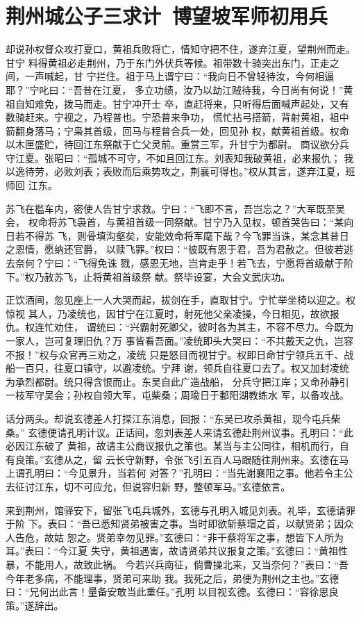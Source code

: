 \chapter{荆州城公子三求计~博望坡军师初用兵}

却说孙权督众攻打夏口，黄祖兵败将亡，情知守把不住，遂弃江夏，望荆州而走。甘宁
料得黄祖必走荆州，乃于东门外伏兵等候。祖带数十骑突出东门，正走之间，一声喊起，甘
宁拦住。祖于马上谓宁曰：“我向日不曾轻待汝，今何相逼耶？”宁叱曰：“吾昔在江夏，
多立功绩，汝乃以劫江贼待我，今日尚有何说！”黄祖自知难免，拨马而走。甘宁冲开士
卒，直赶将来，只听得后面喊声起处，又有数骑赶来。宁视之，乃程普也。宁恐普来争功，
慌忙拈弓搭箭，背射黄祖，祖中箭翻身落马；宁枭其首级，回马与程普合兵一处，回见孙
权，献黄祖首级。权命以木匣盛贮，待回江东祭献于亡父灵前。重赏三军，升甘宁为都尉。
商议欲分兵守江夏。张昭曰：“孤城不可守，不如且回江东。刘表知我破黄祖，必来报仇；
我以逸待劳，必败刘表；表败而后乘势攻之，荆襄可得也。”权从其言，遂弃江夏，班师回
江东。

苏飞在槛车内，密使人告甘宁求救。宁曰：“飞即不言，吾岂忘之？”大军既至吴会，
权命将苏飞袅首，与黄祖首级一同祭献。甘宁乃入见权，顿首哭告曰：“某向日若不得苏
飞，则骨填沟壑矣，安能效命将军麾下哉？今飞罪当诛，某念其昔日之恩情，愿纳还官爵，
以赎飞罪。”权曰：“彼既有恩于君，吾为君赦之。但彼若逃去奈何？宁曰：“飞得免诛
戮，感恩无地，岂肯走乎！若飞去，宁愿将首级献于阶下。”权乃赦苏飞，止将黄祖首级祭
献。祭毕设宴，大会文武庆功。

正饮酒间，忽见座上一人大哭而起，拔剑在手，直取甘宁。宁忙举坐椅以迎之。权惊视
其人，乃凌统也，因甘宁在江夏时，射死他父亲凌操，今日相见，故欲报仇。权连忙劝住，
谓统曰：“兴霸射死卿父，彼时各为其主，不容不尽力。今既为一家人，岂可复理旧仇？万
事皆看吾面。”凌统即头大哭曰：“不共戴天之仇，岂容不报！”权与众官再三劝之，凌统
只是怒目而视甘宁。权即日命甘宁领兵五千、战船一百只，往夏口镇守，以避凌统。宁拜
谢，领兵自往夏口去了。权又加封凌统为承烈都尉。统只得含恨而止。东吴自此广造战船，
分兵守把江岸；又命孙静引一枝军守吴会；孙权自领大军，屯柴桑；周瑜日于鄱阳湖教练水
军，以备攻战。

话分两头。却说玄德差人打探江东消息，回报：“东吴已攻杀黄祖，现今屯兵柴桑。”
玄德便请孔明计议。正话间，忽刘表差人来请玄德赴荆州议事。孔明曰：“此必因江东破了
黄祖，故请主公商议报仇之策也。某当与主公同往，相机而行，自有良策。”玄德从之，留
云长守新野，令张飞引五百人马跟随往荆州来。玄德在马上谓孔明曰：“今见景升，当若何
对答？”孔明曰：“当先谢襄阳之事。他若令主公去征讨江东，切不可应允，但说容归新
野，整顿军马。”玄德依言。

来到荆州，馆驿安下，留张飞屯兵城外，玄德与孔明入城见刘表。礼毕，玄德请罪于阶
下。表曰：“吾已悉知贤弟被害之事。当时即欲斩蔡瑁之首，以献贤弟；因众人告危，故姑
恕之。贤弟幸勿见罪。”玄德曰：“非干蔡将军之事，想皆下人所为耳。”表曰：“今江夏
失守，黄祖遇害，故请贤弟共议报复之策。”玄德曰：“黄祖性暴，不能用人，故致此祸。
今若兴兵南征，倘曹操北来，又当奈何？”表曰：“吾今年老多病，不能理事，贤弟可来助
我。我死之后，弟便为荆州之主也。”玄德曰：“兄何出此言！量备安敢当此重任。”孔明
以目视玄德。玄德曰：“容徐思良策。”遂辞出。

